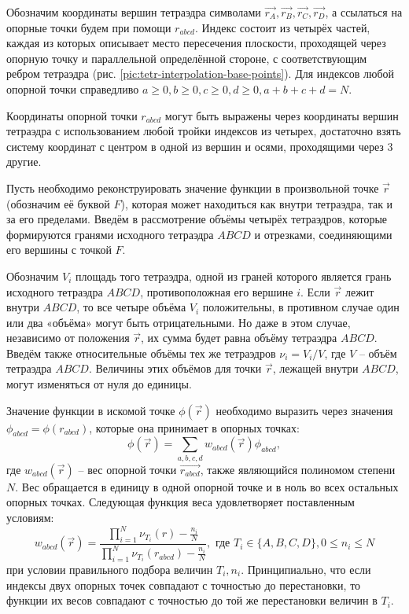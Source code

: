Обозначим координаты вершин тетраэдра символами $\vec{r_A}, \vec{r_B}, \vec{r_C}, \vec{r_D}$, а ссылаться на опорные точки будем при помощи $r_{abcd}$. Индекс состоит из четырёх частей, каждая из которых описывает место пересечения плоскости, проходящей через опорную точку и параллельной определённой стороне, с соответствующим ребром тетраэдра (рис. \ref{pic:tetr-interpolation-base-points}). Для индексов любой опорной точки справедливо $a \ge 0, b \ge 0, c \ge 0, d \ge 0, a+b+c+d = N$.

Координаты опорной точки $r_{abcd}$ могут быть выражены через координаты вершин тетраэдра с использованием любой тройки индексов из четырех, достаточно взять систему координат с центром в одной из вершин и осями, проходящими через 3 другие.

Пусть необходимо реконструировать значение функции в произвольной точке $\vec{r}$ (обозначим её буквой $F$), которая может находиться как внутри тетраэдра, так и за его пределами. Введём в рассмотрение объёмы четырёх тетраэдров, которые формируются гранями исходного тетраэдра $ABCD$ и отрезками, соединяющими его вершины с точкой $F$.

Обозначим $V_i$ площадь того тетраэдра, одной из граней которого является грань исходного тетраэдра $ABCD$, противоположная его вершине $i$. Если $\vec{r}$ лежит внутри $ABCD$, то все четыре объёма $V_i$ положительны, в противном случае один или два «объёма» могут быть отрицательными. Но даже в этом случае, независимо от положения $\vec{r}$, их сумма будет равна объёму тетраэдра $ABCD$. Введём также относительные объёмы тех же тетраэдров $\nu_i = V_i / V$, где $V$ -- объём тетраэдра $ABCD$. Величины этих объёмов для точки $\vec{r}$, лежащей внутри $ABCD$, могут изменяться от нуля до единицы.

Значение функции в искомой точке $\phi(\vec{r})$ необходимо выразить через значения $\phi_{abcd} = \phi(r_{abcd})$, которые она принимает в опорных точках:
\begin{equation}
\phi(\vec{r}) = \sum_{a,b,c,d}{w_{abcd}(\vec{r}) \phi_{abcd}},
\end{equation}
где $w_{abcd}(\vec{r})$ -- вес опорной точки $\vec{r_{abcd}}$, также являющийся полиномом степени $N$. Вес обращается в единицу в одной опорной точке и в ноль во всех остальных опорных точках. Следующая функция веса удовлетворяет поставленным условиям:
\begin{equation}
w_{abcd}(\vec{r}) = \frac{ \prod_{i=1}^N{\nu_{T_i}(r) - \frac{n_i}{N}} }{ \prod_{i=1}^N{\nu_{T_i}(r_{abcd}) - \frac{n_i}{N}} }, \textrm{ где } T_i \in \{A, B, C, D\}, 0 \le n_i \le N
\end{equation}
при условии правильного подбора величин ${T_i}, {n_i}$. Принципиально, что если индексы двух опорных точек совпадают с точностью до перестановки, то функции их весов совпадают с точностью до той же перестановки величин в ${T_i}$.

